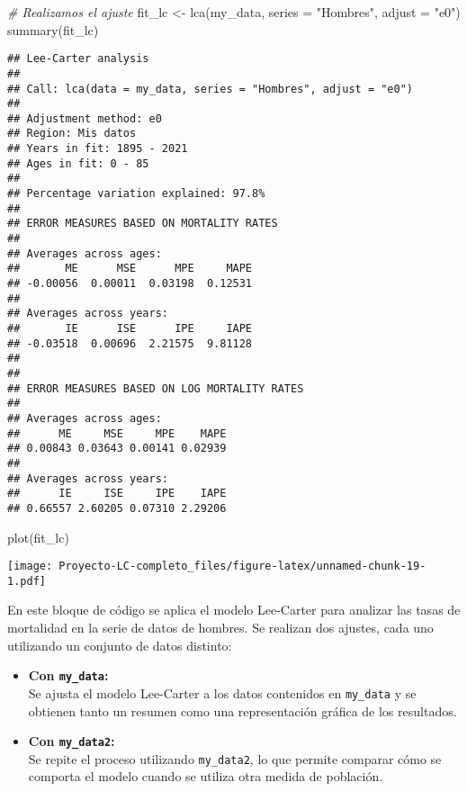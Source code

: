 \documentclass[
]{article}
\newenvironment{Shaded}{\begin{snugshade}}{\end{snugshade}}
\newcommand{\AttributeTok}[1]{\textcolor[rgb]{0.77,0.63,0.00}{#1}}
\newcommand{\CommentTok}[1]{\textcolor[rgb]{0.56,0.35,0.01}{\textit{#1}}}
\newcommand{\FunctionTok}[1]{\textcolor[rgb]{0.00,0.00,0.00}{#1}}
\newcommand{\NormalTok}[1]{#1}
\newcommand{\OtherTok}[1]{\textcolor[rgb]{0.56,0.35,0.01}{#1}}
\newcommand{\StringTok}[1]{\textcolor[rgb]{0.31,0.60,0.02}{#1}}
\begin{document}
\begin{Shaded}
\begin{Highlighting}[]
\CommentTok{\# Realizamos el ajuste}
\NormalTok{fit\_lc }\OtherTok{\textless{}{-}} \FunctionTok{lca}\NormalTok{(my\_data, }\AttributeTok{series =} \StringTok{"Hombres"}\NormalTok{, }\AttributeTok{adjust =} \StringTok{"e0"}\NormalTok{)}
\FunctionTok{summary}\NormalTok{(fit\_lc)}
\end{Highlighting}
\end{Shaded}

\begin{verbatim}
## Lee-Carter analysis
## 
## Call: lca(data = my_data, series = "Hombres", adjust = "e0") 
## 
## Adjustment method: e0
## Region: Mis datos
## Years in fit: 1895 - 2021
## Ages in fit: 0 - 85 
## 
## Percentage variation explained: 97.8%
## 
## ERROR MEASURES BASED ON MORTALITY RATES
## 
## Averages across ages:
##       ME      MSE      MPE     MAPE 
## -0.00056  0.00011  0.03198  0.12531 
## 
## Averages across years:
##       IE      ISE      IPE     IAPE 
## -0.03518  0.00696  2.21575  9.81128 
## 
## 
## ERROR MEASURES BASED ON LOG MORTALITY RATES
## 
## Averages across ages:
##      ME     MSE     MPE    MAPE 
## 0.00843 0.03643 0.00141 0.02939 
## 
## Averages across years:
##      IE     ISE     IPE    IAPE 
## 0.66557 2.60205 0.07310 2.29206
\end{verbatim}

\begin{Shaded}
\begin{Highlighting}[]
\FunctionTok{plot}\NormalTok{(fit\_lc)}
\end{Highlighting}
\end{Shaded}

\texttt{[image: Proyecto-LC-completo\_files/figure-latex/unnamed-chunk-19-1.pdf]}

En este bloque de código se aplica el modelo Lee-Carter para analizar
las tasas de mortalidad en la serie de datos de hombres. Se realizan dos
ajustes, cada uno utilizando un conjunto de datos distinto:

\begin{itemize}
\item
  \textbf{Con \texttt{my\_data}:}\\
  Se ajusta el modelo Lee-Carter a los datos contenidos en
  \texttt{my\_data} y se obtienen tanto un resumen como una
  representación gráfica de los resultados.
\item
  \textbf{Con \texttt{my\_data2}:}\\
  Se repite el proceso utilizando \texttt{my\_data2}, lo que permite
  comparar cómo se comporta el modelo cuando se utiliza otra medida de
  población.
\end{itemize}
\end{document}
